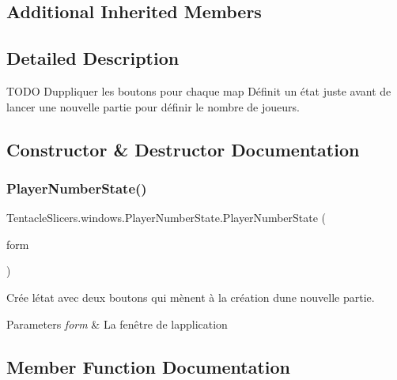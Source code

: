 \subsection*{Additional Inherited Members}


\subsection{Detailed Description}
T\+O\+DO Duppliquer les boutons pour chaque map Définit un état juste avant de lancer une nouvelle partie pour définir le nombre de joueurs. 



\subsection{Constructor \& Destructor Documentation}
\mbox{\label{class_tentacle_slicers_1_1windows_1_1_player_number_state_ac635e6edf7b3fef7faec5abc2be8337e}} 
\subsubsection{\texorpdfstring{Player\+Number\+State()}{PlayerNumberState()}}
{\footnotesize\ttfamily Tentacle\+Slicers.\+windows.\+Player\+Number\+State.\+Player\+Number\+State (\begin{DoxyParamCaption}\item[{\hyperlink{class_tentacle_slicers_1_1windows_1_1_main_form}{Main\+Form}}]{form }\end{DoxyParamCaption})}



Crée l\textquotesingle{}état avec deux boutons qui mènent à la création d\textquotesingle{}une nouvelle partie. 


\begin{DoxyParams}{Parameters}
{\em form} & La fenêtre de l\textquotesingle{}application \\
\hline
\end{DoxyParams}


\subsection{Member Function Documentation}
\mbox{\label{class_tentacle_slicers_1_1windows_1_1_player_number_state_ac25c342f1262c61838013f2dcfa2a7af}} 
